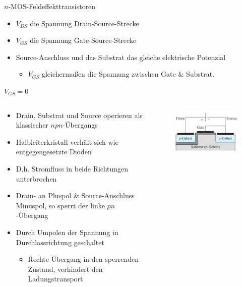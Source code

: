 \documentclass[12pt%
,aspectratio=169%
]{beamer}
\begin{document}
\begin{frame}{$n$-MOS-Feldeffekttransistoren}
\begin{itemize}
	\item $V_{DS}$ die Spannung Drain-Source-Strecke
	\item $V_{GS}$ die Spannung Gate-Source-Strecke
	\item Source-Anschluss und das Substrat das gleiche elektrische Potenzial
	\begin{itemize}
		\item $V_{GS}$ gleichermaßen die Spannung zwischen Gate \& Substrat.
	\end{itemize}
\end{itemize}
\end{frame}

\begin{frame}{$V_{GS} = 0$}
\begin{columns}[T] %
\begin{column}{.62\textwidth}
	\begin{itemize}
		\item Drain, Substrat und Source operieren als klassischer $npn$-Übergangs
		\item Halbleiterkristall verhält sich wie entgegengesetzte Dioden
		\item D.h. Stromfluss in beide Richtungen unterbrochen
		\item Drain- an Pluspol \& Source-Anschluss Minuspol, so sperrt der linke $pn$-Übergang
		\item Durch Umpolen der Spannung in Durchlassrichtung geschaltet
		\begin{itemize}
			\item Rechte Übergang in den sperrenden Zustand, verhindert den Ladungstransport
		\end{itemize}
	\end{itemize}
\end{column}%
\hfill%
\begin{column}{.38\textwidth}
\begin{figure}
\center
\includegraphics[scale=0.5]{pictures/fall1}\\
\end{figure}
\end{column}%
\end{columns}
\end{frame}
\end{document}
